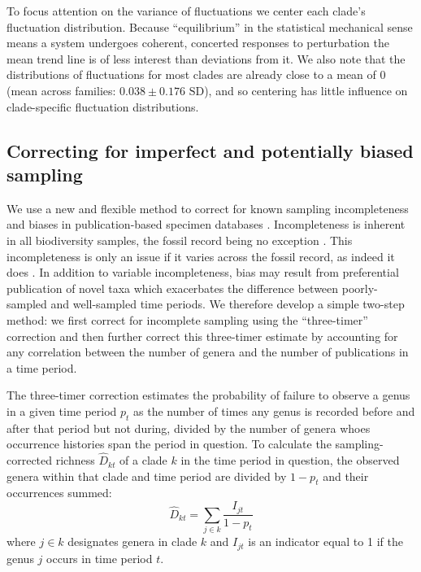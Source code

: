 \documentclass[12pt]{article}
\let\citep=\cite
\begin{document}

To focus attention on the variance of fluctuations we center each
clade's fluctuation distribution. Because ``equilibrium'' in the
statistical mechanical sense means a system undergoes coherent,
concerted responses to perturbation the mean trend line is of less
interest than deviations from it. We also note that the distributions
of fluctuations for most clades are already close to a mean of 0 (mean
across families: $0.038 \pm 0.176 \text{ SD}$), and so centering has
little influence on clade-specific fluctuation distributions.

\subsection*{Correcting for imperfect and potentially biased sampling} 
\label{sec:3TP}
We use a new and flexible method to correct for known sampling
incompleteness and biases in publication-based specimen databases
\citep{alroy08, alroy2010}. Incompleteness is inherent in all
biodiversity samples, the fossil record being no exception
\citep{miller1996, alroy2010, foote2016, starrfelt2016,
  close2018}. This incompleteness is only an issue if it varies across
the fossil record, as indeed it does \citep{alroy2010, foote2016,
  starrfelt2016, close2018}.  In addition to variable incompleteness,
bias may result from preferential publication of novel taxa
\citep{alroy2010} which exacerbates the difference between
poorly-sampled and well-sampled time periods. We therefore develop a
simple two-step method: we first correct for incomplete sampling using
the ``three-timer'' correction \citep{alroy08} and then further
correct this three-timer estimate by accounting for any correlation
between the number of genera and the number of publications in a time
period.

The three-timer correction estimates the probability of failure to
observe a genus in a given time period $p_t$ as the number of times
any genus is recorded before and after that period but not during,
divided by the number of genera whoes occurrence histories span the
period in question.  To calculate the sampling-corrected richness
$\hat{D}_{kt}$ of a clade $k$ in the time period in question, the observed
genera within that clade and time period are divided by $1 - p_t$ and
their occurrences summed:
\begin{equation}
  \hat{D}_{kt} = \sum_{j \in k} \frac{I_{jt}}{1 - p_t}
\end{equation}
where $j \in k$ designates genera in clade $k$ and $I_{jt}$ is an
indicator equal to 1 if the genus $j$ occurs in time period $t$.
\end{document}
